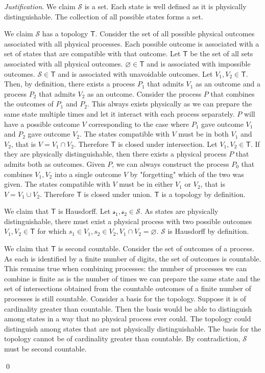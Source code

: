 \documentclass[aps,pra,10pt,twocolumn,floatfix,nofootinbib]{revtex4-1}
\numberwithin{equation}{section}
\theoremstyle{definition}
\newenvironment{justification}{\emph{Justification}.}{\qed}
\begin{document}
\begin{justification}
We claim $\mathcal{S}$ is a set. Each state is well defined as it is physically distinguishable. The collection of all possible states forms a set.

We claim $\mathcal{S}$ has a topology $\mathsf{T}$. Consider the set of all possible physical outcomes associated with all physical processes. Each possible outcome is associated with a set of states that are compatible with that outcome. Let $\mathsf{T}$ be the set of all sets associated with all physical outcomes. $\varnothing \in \mathsf{T}$ and is associated with impossible outcomes. $\mathcal{S} \in \mathsf{T}$ and is associated with unavoidable outcomes. Let $V_1, V_2 \in \mathsf{T}$. Then, by definition, there exists a process $P_1$ that admits $V_1$ as an outcome and a process $P_2$ that admits $V_2$ as an outcome. Consider the process $P$ that combines the outcomes of $P_1$ and $P_2$. This always exists physically as we can prepare the same state multiple times and let it interact with each process separately. $P$ will have a possible outcome $V$ corresponding to the case where $P_1$ gave outcome $V_1$ and $P_2$ gave outcome $V_2$. The states compatible with $V$ must be in both $V_1$ and $V_2$, that is $V = V_1 \cap V_2$. Therefore $\mathsf{T}$ is closed under intersection. Let $V_1, V_2 \in \mathsf{T}$. If they are physically distinguishable, then there exists a physical process $P$ that admits both as outcomes. Given $P$, we can always construct the process $P_0$ that combines $V_1, V_2$ into a single outcome $V$ by "forgetting" which of the two was given. The states compatible with $V$ must be in either $V_1$ or $V_2$, that is $V = V_1 \cup V_2$. Therefore $\mathsf{T}$ is closed under union. $\mathsf{T}$ is a topology by definition.

We claim that $\mathsf{T}$ is Hausdorff. Let $\mathcal{s_1}, \mathcal{s_2} \in \mathcal{S}$. As states are physically distinguishable, there must exist a physical process with two possible outcomes $V_1, V_2 \in \mathsf{T}$ for which $s_1 \in V_1, s_2 \in V_2, V_1 \cap V_2 = \varnothing$. $\mathcal{S}$ is Hausdorff by definition.

We claim that $\mathsf{T}$ is second countable. Consider the set of outcomes of a process. As each is identified by a finite number of digits, the set of outcomes is countable. This remains true when combining processes: the number of processes we can combine is finite as is the number of times we can prepare the same state and the set of intersections obtained from the countable outcomes of a finite number of processes is still countable. Consider a basis for the topology. Suppose it is of cardinality greater than countable. Then the basis would be able to distinguish among states in a way that no physical process ever could. The topology could distinguish among states that are not physically distinguishable. The basis for the topology cannot be of cardinality greater than countable. By contradiction, $\mathcal{S}$ must be second countable.

\end{justification}
\end{document}
